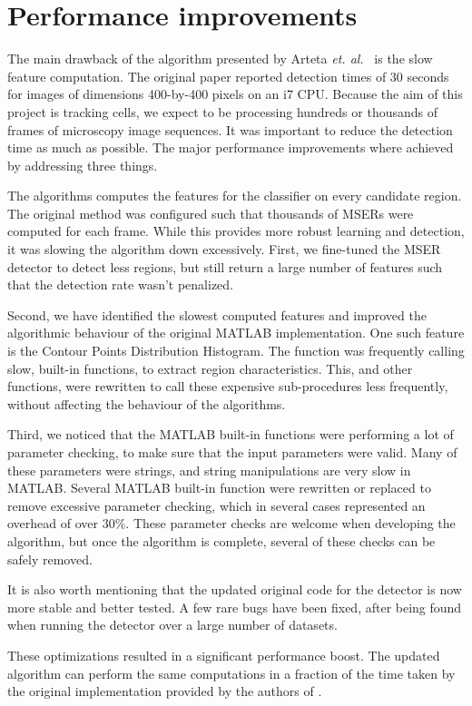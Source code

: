 	\section{Performance improvements}
	\label{sec:detector_changes}
		The main drawback of the algorithm presented by Arteta \emph{et. al.}~\cite{arteta12} is the slow feature computation. The original paper reported detection times of 30 seconds for images of dimensions 400-by-400 pixels on an i7 CPU. Because the aim of this project is tracking cells, we expect to be processing hundreds or thousands of frames of microscopy image sequences. It was important to reduce the detection time as much as possible. The major performance improvements where achieved by addressing three things.
		
		The algorithms computes the features for the classifier on every candidate region. The original method was configured such that thousands of MSERs were computed for each frame. While this provides more robust learning and detection, it was slowing the algorithm down excessively. First, we fine-tuned the MSER detector to detect less regions, but still return a large number of features such that the detection rate wasn't penalized.
		
		Second, we have identified the slowest computed features and improved the algorithmic behaviour of the original MATLAB implementation. One such feature is the Contour Points Distribution Histogram. The function was frequently calling slow, built-in functions, to extract region characteristics. This, and other functions, were rewritten to call these expensive sub-procedures less frequently, without affecting the behaviour of the algorithms.
		
		Third, we noticed that the MATLAB built-in functions were performing a lot of parameter checking, to make sure that the input parameters were valid. Many of these parameters were strings, and string manipulations are very slow in MATLAB. Several MATLAB built-in function were rewritten or replaced to remove excessive parameter checking, which in several cases represented an overhead of over $30\%$. These parameter checks are welcome when developing the algorithm, but once the algorithm is complete, several of these checks can be safely removed.
		
		It is also worth mentioning that the updated original code for the detector is now more stable and better tested. A few rare bugs have been fixed, after being found when running the detector over a large number of datasets.
		
		These optimizations resulted in a significant performance boost. The updated algorithm can perform the same computations in a fraction of the time taken by the original implementation provided by the authors of \cite{arteta12}.
	